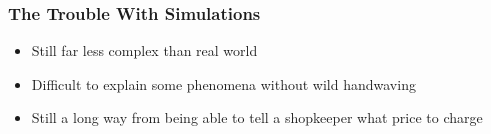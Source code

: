 \documentclass{beamer}
\begin{document}
\frame
{
  \frametitle{The Trouble With Simulations}
  \begin{itemize}
    \setlength{\itemsep}{\baselineskip}
  \item<1-> Still far less complex than real world
  \item<2-> Difficult to explain some phenomena without wild
    handwaving
  \item<3-> Still a long way from being able to tell a shopkeeper what
    price to charge
  \end{itemize}
}
\end{document}
